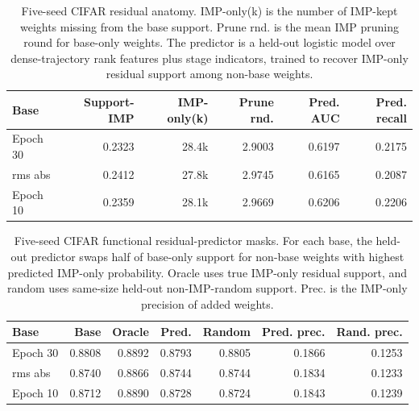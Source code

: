 \begin{table}[t]
\centering
\small
\setlength{\tabcolsep}{4pt}
\begin{tabular}{lrrrrr}
\toprule
Base & Support-IMP & IMP-only(k) & Prune rnd. & Pred. AUC & Pred. recall \\
\midrule
Epoch 30 & 0.2323 & 28.4k & 2.9003 & 0.6197 & 0.2175 \\
rms abs & 0.2412 & 27.8k & 2.9745 & 0.6165 & 0.2087 \\
Epoch 10 & 0.2359 & 28.1k & 2.9669 & 0.6206 & 0.2206 \\
\bottomrule
\end{tabular}
\caption{Five-seed CIFAR residual anatomy. IMP-only(k) is the number of IMP-kept weights missing from the base support. Prune rnd. is the mean IMP pruning round for base-only weights. The predictor is a held-out logistic model over dense-trajectory rank features plus stage indicators, trained to recover IMP-only residual support among non-base weights.}
\label{tab:cifar-residual-anatomy}
\end{table}

\begin{table}[t]
\centering
\small
\setlength{\tabcolsep}{3pt}
\begin{tabular}{lrrrrrr}
\toprule
Base & Base & Oracle & Pred. & Random & Pred. prec. & Rand. prec. \\
\midrule
Epoch 30 & 0.8808 & 0.8892 & 0.8793 & 0.8805 & 0.1866 & 0.1253 \\
rms abs & 0.8740 & 0.8866 & 0.8744 & 0.8744 & 0.1834 & 0.1233 \\
Epoch 10 & 0.8712 & 0.8890 & 0.8728 & 0.8724 & 0.1843 & 0.1239 \\
\bottomrule
\end{tabular}
\caption{Five-seed CIFAR functional residual-predictor masks. For each base, the held-out predictor swaps half of base-only support for non-base weights with highest predicted IMP-only probability. Oracle uses true IMP-only residual support, and random uses same-size held-out non-IMP-random support. Prec. is the IMP-only precision of added weights.}
\label{tab:cifar-residual-predictor-mask}
\end{table}

